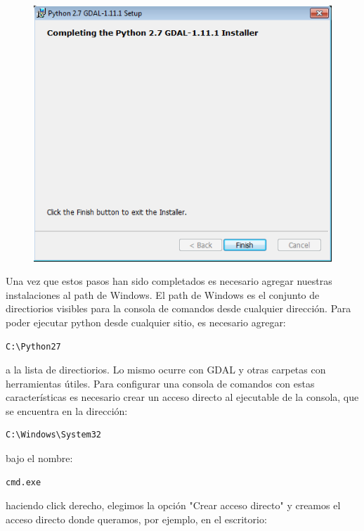 \documentclass[11pt, spanish]{memoir}
\begin{document}
\begin{figure}[H]
\centering
\includegraphics[width=14cm]{bindings3.png}
\end{figure}

Una vez que estos pasos han sido completados es necesario agregar nuestras instalaciones al path de Windows. El path de Windows es el conjunto de directiorios visibles para la consola de comandos desde cualquier dirección. Para poder ejecutar python desde cualquier sitio, es necesario agregar:

\begin{lstlisting} 
C:\Python27
\end{lstlisting}

a la lista de directiorios. Lo mismo ocurre con GDAL y otras carpetas con herramientas útiles. Para configurar una consola de comandos con estas características es necesario crear un acceso directo al ejecutable de la consola, que se encuentra en la dirección:

\begin{lstlisting} 
C:\Windows\System32
\end{lstlisting}

bajo el nombre:

\begin{lstlisting} 
cmd.exe
\end{lstlisting}

haciendo click derecho, elegimos la opción "Crear acceso directo" y creamos el acceso directo donde queramos, por ejemplo, en el escritorio: 
\end{document}
